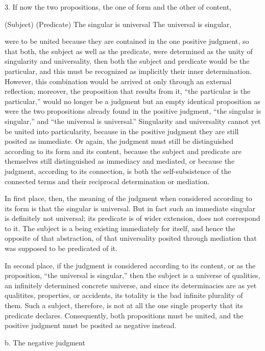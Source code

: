 3. If now the two propositions,
the one of form and the other of content,

(Subject) (Predicate)
The singular is universal
The universal is singular,

were to be united because
they are contained in the one positive judgment,
so that both, the subject as well as the predicate,
were determined as the unity of singularity and universality,
then both the subject and predicate would be the particular,
and this must be recognized as
implicitly their inner determination.
However, this combination would be arrived at only
through an external reflection;
moreover, the proposition that results from it,
“the particular is the particular,”
would no longer be a judgment
but an empty identical proposition
as were the two propositions already found
in the positive judgment,
“the singular is singular,”
and “the universal is universal.”
Singularity and universality cannot
yet be united into particularity,
because in the positive judgment
they are still posited as immediate.
Or again, the judgment must still be
distinguished according to its form and its content,
because the subject and predicate are themselves
still distinguished as immediacy and mediated,
or because the judgment, according to its connection,
is both the self-subsistence of the connected terms
and their reciprocal determination or mediation.

In first place, then, the meaning of the judgment
when considered according to its form is
that the singular is universal.
But in fact such an immediate singular is
definitely not universal;
its predicate is of wider extension,
does not correspond to it.
The subject is a being existing
immediately for itself,
and hence the opposite of that abstraction,
of that universality posited through mediation
that was supposed to be predicated of it.

In second place, if the judgment is
considered according to its content,
or as the proposition, “the universal is singular,”
then the subject is a universe of qualities,
an infinitely determined concrete universe,
and since its determinacies are as yet
qualitites, properties, or accidents,
its totality is the bad infinite plurality of them.
Such a subject, therefore, is not at all
the one single property that its predicate declares.
Consequently, both propositions must be united,
and the positive judgment must be posited as negative instead.

b. The negative judgment

